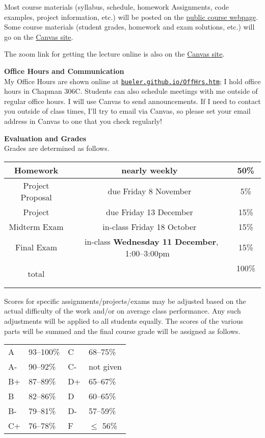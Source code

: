 \documentclass[12pt]{article}
\renewcommand{\emph}[1]{\textsf{\textbf{#1}}}
\newcommand{\localhead}[1]{\par\smallskip\textbf{#1} \smallskip\nobreak\\}%
\def\heading#1{\localhead{\large\emph{#1}}}
\begin{document}
Most course materials (syllabus, schedule, homework Assignments, code examples, project information, etc.) will be posted on the \href{https://bueler.github.io/opt/}{public course webpage}.  Some course materials (student grades, homework and exam solutions, etc.) will go on the \href{https://canvas.alaska.edu/courses/21663}{Canvas site}.

The zoom link for getting the lecture online is also on the \href{https://canvas.alaska.edu/courses/21663}{Canvas site}.

\heading{Office Hours and Communication}
My Office Hours are shown online at \href{http://bueler.github.io/OffHrs.htm}{\texttt{bueler.github.io/OffHrs.htm}}; I hold office hours in Chapman 306C.  Students can also schedule meetings with me outside of regular office hours.  I will use Canvas to send announcements.  If I need to contact you outside of class times, I'll try to email via Canvas, so please set your email address in Canvas to one that you check regularly!


\heading{Evaluation and Grades}
Grades are determined as follows.

\begin{tabular}{|c|c|c|}
\hline
Homework & nearly weekly & 50\% \\
\hline
Project Proposal & due Friday 8 November & 5\%  \\
\hline
Project & due Friday 13 December & 15\%  \\
\hline
Midterm Exam & in-class Friday 18 October & 15\%  \\
\hline
Final Exam & \, in-class \emph{Wednesday 11 December}, 1:00--3:00pm \, & 15\% \\
\hline
total & & 100\% \, \\
\hline
\end{tabular}

Scores for specific assignments/projects/exams may be adjusted based on the actual difficulty of the work and/or on average class performance.  Any such adjustments will be applied to all students equally.  The scores of the various parts will be summed and the final course grade will be assigned as follows.

\begin{tabular}{llll}
A  & 93--100\%& C  & 68--75\%  \\
A- & 90--92\% & C- & not given \\
B+ & 87--89\% & D+ & 65--67\%  \\
B  & 82--86\% & D  & 60--65\%  \\
B- & 79--81\% & D- & 57--59\%  \\
C+ & 76--78\% & F  & $\le$ 56\%
\end{tabular}
\end{document}
